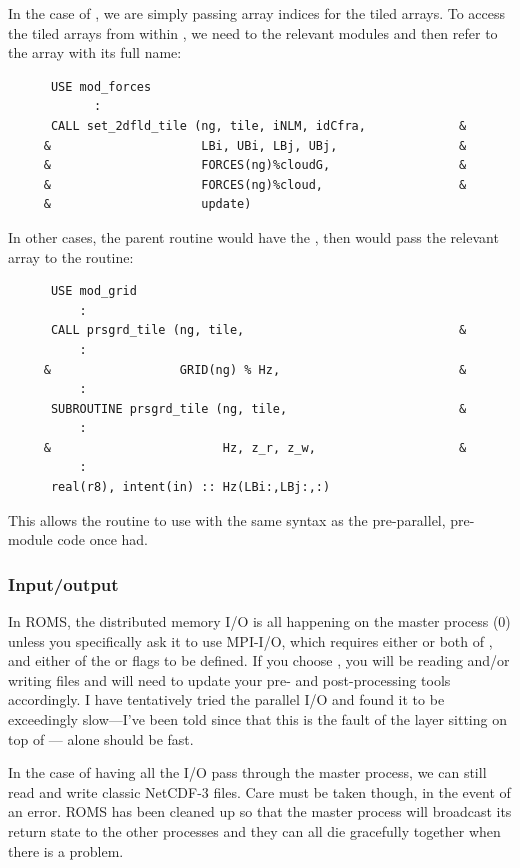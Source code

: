 In the case of , we are simply passing array indices
for the tiled arrays. To access the tiled arrays from within
, we need to  the relevant modules
and then refer to the array with its full name:
\begin{verbatim}
      USE mod_forces
            :
      CALL set_2dfld_tile (ng, tile, iNLM, idCfra,             &
     &                     LBi, UBi, LBj, UBj,                 &
     &                     FORCES(ng)%cloudG,                  &
     &                     FORCES(ng)%cloud,                   &
     &                     update)
\end{verbatim}
In other cases, the parent routine would have the , then
would pass the relevant array to the  routine:
\begin{verbatim}
      USE mod_grid
          :
      CALL prsgrd_tile (ng, tile,                              &
          :
     &                  GRID(ng) % Hz,                         &
          :
      SUBROUTINE prsgrd_tile (ng, tile,                        &
          :
     &                        Hz, z_r, z_w,                    &
          :
      real(r8), intent(in) :: Hz(LBi:,LBj:,:)
\end{verbatim}
This allows the  routine to use  with the same
syntax as the pre-parallel, pre-module code once had.

\subsubsection{Input/output}

In ROMS, the distributed memory I/O is all happening on the master process
(0) unless you specifically ask it to use MPI-I/O, which requires
either or both of ,  and
either of the  or   flags to be
defined. If you choose , you will be reading and/or writing
 files and will need to update your pre- and post-processing
tools accordingly. I have tentatively tried the parallel I/O and
found it to be exceedingly slow---I've been told since that this
is the fault of the  layer sitting on top of
--- alone should be fast.

In the case of having all the I/O pass through the master process,
we can still read and write classic NetCDF-3 files. Care must be
taken though, in the event of an error. ROMS has been cleaned up so
that the master process will broadcast its return state to the other
processes and they can all die gracefully together when there is a
problem.


